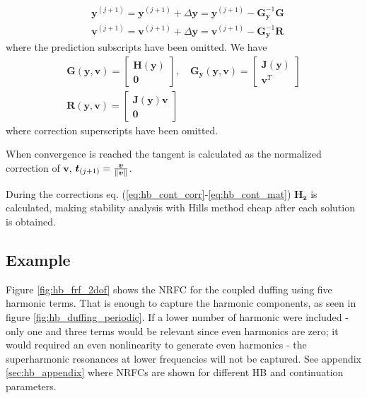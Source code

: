 \begin{equation}
  \label{eq:hb_cont_corr}
  \begin{aligned}
    &\bm y^{(j+1)} = \bm y^{(j+1)} + \Delta \bm y =
    \bm y^{(j+1)} -\bm G^{-1}_{\bm y} \bm G \\
    &\bm v^{(j+1)} = \bm v^{(j+1)} + \Delta \bm y =
    \bm v^{(j+1)} -\bm G^{-1}_{\bm y} \bm R
  \end{aligned}
\end{equation}
where the prediction subscripts have been omitted. We have
\begin{equation}
  \label{eq:hb_cont_mat}
  \begin{aligned}
    \bm G(\bm y, \bm v) =
    \begin{bmatrix}
      \bm H(\bm y) \\ \bm 0
    \end{bmatrix}, \quad
    \bm G_{\bm y}(\bm y, \bm v) =
    \begin{bmatrix}
      \bm J(\bm y) \\ \bm v^T
    \end{bmatrix} \\
      \bm R(\bm y, \bm v) =
  \begin{bmatrix}
    \bm J(\bm y) \bm v \\ \bm 0
  \end{bmatrix}
  \end{aligned}
\end{equation}
where correction superscripts have been omitted.

When convergence is reached the tangent is calculated as the normalized
correction of $\bm v$, $\bm t_{(j+1)} = \frac{\bm v}{\left\lVert \bm v \right\rVert}$.

During the corrections eq. (\ref{eq:hb_cont_corr}-\ref{eq:hb_cont_mat}) $\bm H_{\bm
  z}$ is calculated, making stability analysis with Hills method cheap after
each solution is obtained.

\subsection{Example}
\label{sec:cont_example}

Figure \ref{fig:hb_frf_2dof} shows the NRFC for the coupled duffing using five
harmonic terms. That is enough to capture the harmonic components, as seen in
figure \ref{fig:hb_duffing_periodic}. If a lower number of harmonic were
included - only one and three terms would be relevant since even harmonics are
zero; it would required an even nonlinearity to generate even harmonics - the
superharmonic resonances at lower frequencies will not be captured. See appendix
\ref{sec:hb_appendix} where NRFCs are shown for different HB and continuation
parameters.

